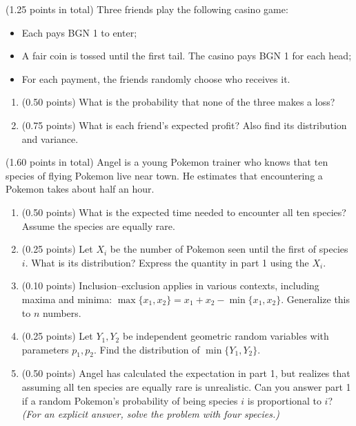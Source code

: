 \documentclass[a4paper]{report}
\begin{document}
\begin{problem} (1.25 points in total)
    Three friends play the following casino game:
  \begin{itemize}
        \item Each pays BGN 1 to enter;
        \item A fair coin is tossed until the first tail. The casino pays BGN 1 for each head;
        \item For each payment, the friends randomly choose who receives it.
  \end{itemize}
\begin{enumerate}
    \item (0.50 points) What is the probability
    that none of the three makes a loss?
    \item (0.75 points) What is each friend's expected profit? Also find its distribution and variance.
\end{enumerate}
\end{problem}

\begin{problem} (1.60 points in total)
Angel is a young Pokemon trainer who knows that ten species of flying Pokemon live near town.
He estimates that encountering a Pokemon takes about half an hour.
  \begin{enumerate}
    \item (0.50 points)
    What is the expected time needed to encounter all ten species? Assume the species are equally rare.
    \item (0.25 points) Let $X_i$ be the number of Pokemon seen until the first of species $i$. What is its distribution?
    Express the quantity in part 1 using the $X_i$.
    \item (0.10 points) Inclusion--exclusion applies
    in various contexts, including maxima and minima:
    $\max\{x_1,x_2\}=x_1+x_2-\min\{x_1,x_2\}$. Generalize this to $n$ numbers.
    \item (0.25 points) Let $Y_1,Y_2$
    be independent geometric random variables
    with parameters $p_1,p_2$. Find
    the distribution of $\min\{Y_1,Y_2\}$.
    \item (0.50 points)
    Angel has calculated the expectation in part 1, but realizes
    that assuming
    all ten species are equally rare
    is unrealistic. Can you answer part 1 if
    a random Pokemon's probability of being species $i$ is proportional to $i$? \textit{(For an explicit answer, solve the problem with four species.)}
  \end{enumerate}



\end{problem}
\end{document}
